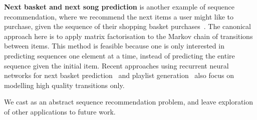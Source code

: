 %
{\bf Next basket and next song prediction}
is another example of sequence recommendation,
where we recommend the next items a user might like to purchase, given the sequence of their shopping basket purchases~\citep{Rendle:2010,Wang:2015}.
The canonical approach here is to apply matrix factorisation to the Markov chain of transitions between items.
This method is feasible because one is only interested in predicting sequences one element at a time, instead of predicting the entire sequence given the initial item.
Recent approaches using recurrent neural networks for
next basket prediction~\cite{yu2016dynamic} and playlist
generation~\cite{choi2016towards} also focus on modelling high quality transitions only.

We cast \trajrec as an abstract sequence recommendation problem,
and leave exploration of other applications to future work.

%


%

%





